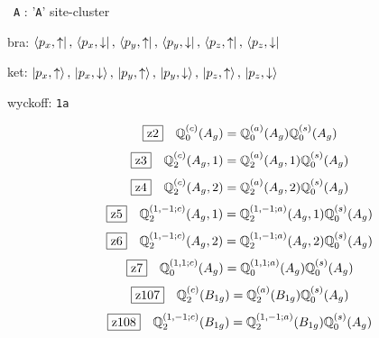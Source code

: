 \documentclass[fleqn,10pt,landscape]{jsarticle}
\begin{document}
\noindent\textbullet\, \texttt{A} : '\texttt{A}' site-cluster

\noindent\quad * bra: $\bra{p_{x},\uparrow},\, \bra{p_{x},\downarrow},\, \bra{p_{y},\uparrow},\, \bra{p_{y},\downarrow},\, \bra{p_{z},\uparrow},\, \bra{p_{z},\downarrow}$

\noindent\quad * ket: $\ket{p_{x},\uparrow},\, \ket{p_{x},\downarrow},\, \ket{p_{y},\uparrow},\, \ket{p_{y},\downarrow},\, \ket{p_{z},\uparrow},\, \ket{p_{z},\downarrow}$

\noindent\quad * wyckoff: \texttt{1a}

\begin{dmath*}
\hspace*{3mm}\fbox{z2}\quad \mathbb{Q}_{0}^{(c)}(A_{g})=\mathbb{Q}_{0}^{(a)}(A_{g}) \mathbb{Q}_{0}^{(s)}(A_{g})
\end{dmath*}
\begin{dmath*}
\hspace*{3mm}\fbox{z3}\quad \mathbb{Q}_{2}^{(c)}(A_{g},1)=\mathbb{Q}_{2}^{(a)}(A_{g},1) \mathbb{Q}_{0}^{(s)}(A_{g})
\end{dmath*}
\begin{dmath*}
\hspace*{3mm}\fbox{z4}\quad \mathbb{Q}_{2}^{(c)}(A_{g},2)=\mathbb{Q}_{2}^{(a)}(A_{g},2) \mathbb{Q}_{0}^{(s)}(A_{g})
\end{dmath*}
\begin{dmath*}
\hspace*{3mm}\fbox{z5}\quad \mathbb{Q}_{2}^{(1,-1;c)}(A_{g},1)=\mathbb{Q}_{2}^{(1,-1;a)}(A_{g},1) \mathbb{Q}_{0}^{(s)}(A_{g})
\end{dmath*}
\begin{dmath*}
\hspace*{3mm}\fbox{z6}\quad \mathbb{Q}_{2}^{(1,-1;c)}(A_{g},2)=\mathbb{Q}_{2}^{(1,-1;a)}(A_{g},2) \mathbb{Q}_{0}^{(s)}(A_{g})
\end{dmath*}
\begin{dmath*}
\hspace*{3mm}\fbox{z7}\quad \mathbb{Q}_{0}^{(1,1;c)}(A_{g})=\mathbb{Q}_{0}^{(1,1;a)}(A_{g}) \mathbb{Q}_{0}^{(s)}(A_{g})
\end{dmath*}
\begin{dmath*}
\hspace*{3mm}\fbox{z107}\quad \mathbb{Q}_{2}^{(c)}(B_{1g})=\mathbb{Q}_{2}^{(a)}(B_{1g}) \mathbb{Q}_{0}^{(s)}(A_{g})
\end{dmath*}
\begin{dmath*}
\hspace*{3mm}\fbox{z108}\quad \mathbb{Q}_{2}^{(1,-1;c)}(B_{1g})=\mathbb{Q}_{2}^{(1,-1;a)}(B_{1g}) \mathbb{Q}_{0}^{(s)}(A_{g})
\end{dmath*}
\end{document}
